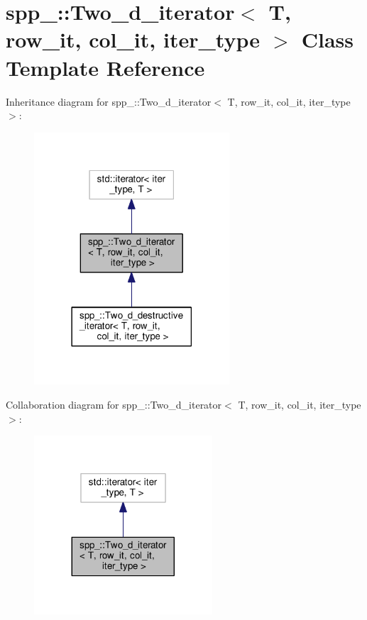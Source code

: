\hypertarget{classspp___1_1_two__d__iterator}{}\section{spp\+\_\+\+:\+:Two\+\_\+d\+\_\+iterator$<$ T, row\+\_\+it, col\+\_\+it, iter\+\_\+type $>$ Class Template Reference}
\label{classspp___1_1_two__d__iterator}


Inheritance diagram for spp\+\_\+\+:\+:Two\+\_\+d\+\_\+iterator$<$ T, row\+\_\+it, col\+\_\+it, iter\+\_\+type $>$\+:\nopagebreak
\begin{figure}[H]
\begin{center}
\leavevmode
\includegraphics[width=206pt]{classspp___1_1_two__d__iterator__inherit__graph}
\end{center}
\end{figure}


Collaboration diagram for spp\+\_\+\+:\+:Two\+\_\+d\+\_\+iterator$<$ T, row\+\_\+it, col\+\_\+it, iter\+\_\+type $>$\+:\nopagebreak
\begin{figure}[H]
\begin{center}
\leavevmode
\includegraphics[width=188pt]{classspp___1_1_two__d__iterator__coll__graph}
\end{center}
\end{figure}
